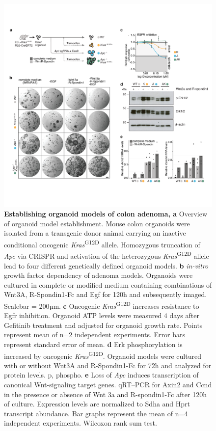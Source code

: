 \begin{flushleft}
\begin{figure}[H]
\centering
\includegraphics[width=\textwidth,
                keepaspectratio]{figures/adenomaprofiling/pdf/fig_1_0.pdf}
\caption[Establishing organoid models of colon adenoma]{\textbf{Establishing organoid models of colon adenoma, a} Overview of organoid model establishment. Mouse colon organoids were isolated from a transgenic donor animal carrying an inactive conditional oncogenic \textit{Kras}\textsuperscript{G12D} allele. Homozygous truncation of \textit{Apc} via CRISPR and activation of the heterozygous \textit{Kras}\textsuperscript{G12D} allele lead to four different genetically defined organoid models.
\textbf{b} \textit{in-vitro} growth factor dependency of adenoma models. Organoids were cultured in complete or modified medium containing combinations of Wnt3A, R-Spondin1-Fc and Egf for 120h and subsequently imaged. Scalebar = 200µm.
\textbf{c}	Oncogenic \textit{Kras}\textsuperscript{G12D} increases resistance to Egfr inhibition. Organoid ATP levels were measured 4 days after Gefitinib treatment and adjusted for organoid growth rate. Points represent mean of n=2 independent experiments. Error bars represent standard error of mean.
\textbf{d} Erk phosphorylation is increased by oncogenic \textit{Kras}\textsuperscript{G12D}. Organoid models were cultured with or without Wnt3A and R-Spondin1-Fc for 72h and analyzed for protein levels. p, phospho.   
\textbf{e}	Loss of \textit{Apc} induces transcription of canonical Wnt-signaling target genes. qRT–PCR for Axin2 and Ccnd in the presence or absence of Wnt 3a and R-spondin1-Fc after 120h of culture. Expression levels are normalized to Sdha and Hprt transcript abundance. Bar graphs represent the mean of n=4 independent experiments. Wilcoxon rank sum test.
}
\label{fig_a10}
\end{figure}


\end{flushleft}
